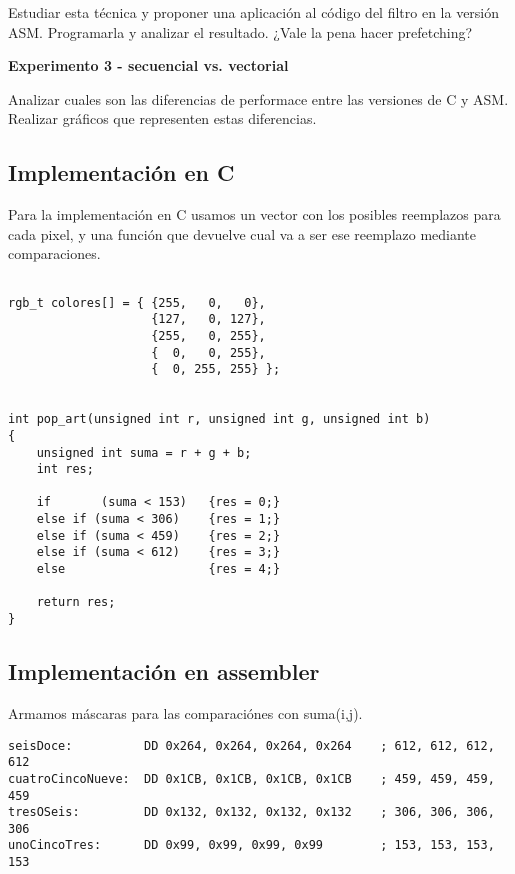  \vspace*{0.2cm}
  Estudiar esta técnica y proponer una aplicación al código del filtro en la versión ASM.
  Programarla y analizar el resultado. ¿Vale la pena hacer prefetching?

\vspace*{0.3cm} \noindent
\textbf{Experimento 3 - secuencial vs. vectorial}

  Analizar cuales son las diferencias de performace entre las versiones de C y ASM. 
  Realizar gráficos que representen estas diferencias.



\subsection{Implementaci\'on en C}
Para la implementaci\'on en C usamos un vector con los posibles reemplazos para cada pixel, y una funci\'on que devuelve cual va a ser ese reemplazo mediante comparaciones.
\begin{codesnippet}
\begin{verbatim}

rgb_t colores[] = { {255,   0,   0},
                    {127,   0, 127},
                    {255,   0, 255},
                    {  0,   0, 255},
                    {  0, 255, 255} };

			
int pop_art(unsigned int r, unsigned int g, unsigned int b)
{
	unsigned int suma = r + g + b;
	int res;
	
	if 		 (suma < 153)	{res = 0;}
	else if (suma < 306)	{res = 1;}
	else if (suma < 459)	{res = 2;}
	else if (suma < 612)	{res = 3;}
	else 					{res = 4;}
	
	return res;
}
\end{verbatim}
\end{codesnippet}

\subsection{Implementaci\'on en assembler}
Armamos máscaras para las comparaci\'ones con suma(i,j).
\begin{codesnippet}
\begin{verbatim}
seisDoce:          DD 0x264, 0x264, 0x264, 0x264    ; 612, 612, 612, 612			
cuatroCincoNueve:  DD 0x1CB, 0x1CB, 0x1CB, 0x1CB    ; 459, 459, 459, 459	
tresOSeis:         DD 0x132, 0x132, 0x132, 0x132    ; 306, 306, 306, 306	
unoCincoTres:      DD 0x99, 0x99, 0x99, 0x99        ; 153, 153, 153, 153
\end{verbatim}
\end{codesnippet}

